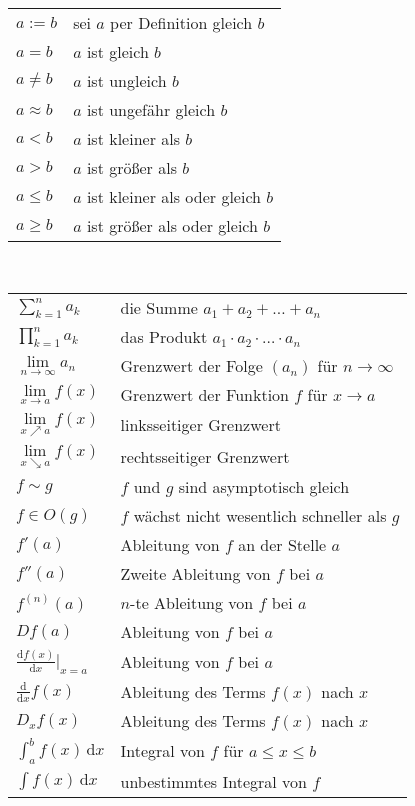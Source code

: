 \vspace{0.8em}\noindent
{}\\[2pt]
\begin{tabular}{@{}ll}
$a:=b$ & sei $a$ per Definition gleich $b$\\
$a=b$ & $a$ ist gleich $b$\\
$a\ne b$ & $a$ ist ungleich $b$\\
$a\approx b$ & $a$ ist ungefähr gleich $b$\\
$a<b$ & $a$ ist kleiner als $b$\\
$a>b$ & $a$ ist größer als $b$\\
$a\le b$ & $a$ ist kleiner als oder gleich $b$\\
$a\ge b$ & $a$ ist größer als oder gleich $b$
\end{tabular}

\newpage
\vspace{0.8em}\noindent
{}\\[2pt]
\begin{tabular}{@{}l@{\enspace}l}
$\sum_{k=1}^n a_k$ & die Summe $a_1+a_2+\ldots+a_n$\\[4pt]
$\prod_{k=1}^n a_k$ & das Produkt $a_1\cdot a_2\cdot\ldots\cdot a_n$\\[4pt]
$\lim\limits_{n\to\infty} a_n$ & Grenzwert der Folge $(a_n)$ für $n\to\infty$\\[8pt]
$\lim\limits_{x\to a} f(x)$ & Grenzwert der Funktion $f$ für $x\to a$\\[8pt]
$\lim\limits_{x\nearrow a} f(x)$ & linksseitiger Grenzwert\\[8pt]
$\lim\limits_{x\searrow a} f(x)$ & rechtsseitiger Grenzwert\\[8pt]
$f\sim g$ & $f$ und $g$ sind asymptotisch gleich\\
$f\in O(g)$ & $f$ wächst nicht wesentlich schneller als $g$\\
$f'(a)$ & Ableitung von $f$ an der Stelle $a$\\
$f''(a)$ & Zweite Ableitung von $f$ bei $a$\\
$f^{(n)}(a)$ & $n$-te Ableitung von $f$ bei $a$\\[2pt]
$Df(a)$ & Ableitung von $f$ bei $a$\\[2pt]
$\frac{\mathrm df(x)}{\mathrm dx}\big|_{x=a}$ & Ableitung von $f$ bei $a$\\[2pt]
$\frac{\mathrm d}{\mathrm dx}f(x)$ & Ableitung des Terms $f(x)$ nach $x$\\[2pt]
$D_x f(x)$ & Ableitung des Terms $f(x)$ nach $x$\\
$\int_a^b\! f(x)\,\mathrm dx$ & Integral von $f$ für $a\le x\le b$\\[4pt]
$\int\! f(x)\,\mathrm dx$ & unbestimmtes Integral von $f$\\
\end{tabular}

